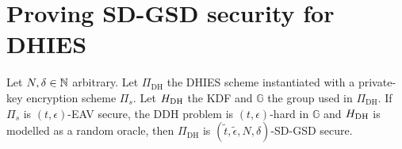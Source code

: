 \section{Proving SD-GSD security for DHIES}


\begin{theorem} \label{theorem:sdgsd-security}
	Let $N, \delta \in \mathbb{N}$ arbitrary. Let $\Pi_{\mathrm{DH}}$ the DHIES scheme instantiated with a private-key encryption scheme $\Pi_s$. Let $H_\mathrm{DH}$ the KDF and $\mathbb{G}$ the group used in $\Pi_{\mathrm{DH}}$. If $\Pi_s$ is $(t, \epsilon)$-EAV secure, the DDH problem is $(t, \epsilon)$-hard in $\mathbb{G}$ and $H_\mathrm{DH}$ is modelled as a random oracle, then $\Pi_{\mathrm{DH}}$ is $(\tilde{t}, \tilde{\epsilon}, N, \delta)$-SD-GSD secure.
\end{theorem}

